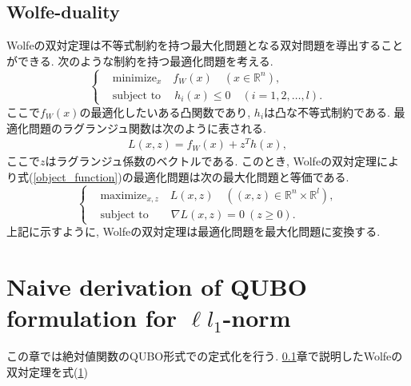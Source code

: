 \documentclass[fp,twocolumn]{jpsj3}
\begin{document}
\subsection{Wolfe-duality} \label{sec:wolfe}
Wolfeの双対定理は不等式制約を持つ最大化問題となる双対問題を導出することができる. 次のような制約を持つ最適化問題を考える.
\begin{equation}
  \left\{
  \begin{aligned}
    & \text{minimize}_{x}  \quad  f_{W}(x) \quad (x\in\mathbb{R}^{n}),\\
    & \text{subject to}  \ \quad h_{i}(x)\leq 0 \quad (i=1,2,\dots,l). \label{object_function}
  \end{aligned}
  \right.
\end{equation}
ここで$f_{W}(x)$の最適化したいある凸関数であり, $h_{i}$は凸な不等式制約である. 最適化問題のラグランジュ関数は次のように表される.
\begin{eqnarray}
  L(x,z)=f_{W}(x)+z^{T}h(x),
\end{eqnarray}
ここで$z$はラグランジュ係数のベクトルである. このとき, Wolfeの双対定理により式(\ref{object_function})の最適化問題は次の最大化問題と等価である.
\begin{equation}
  \left\{
  \begin{aligned}
    & \text{maximize}_{x,z}  \quad L(x,z) \quad ((x,z)\in \mathbb{R}^{n}\times\mathbb{R}^{l}),\\
    & \text{subject to}  \qquad \nabla L(x,z)=0 \ (z \geq 0).
  \end{aligned}
  \right.
\end{equation}
上記に示すように, Wolfeの双対定理は最適化問題を最大化問題に変換する. 

\section{Naive derivation of QUBO formulation for $\ell{l}_{1}$-norm}
この章では絶対値関数のQUBO形式での定式化を行う.
\ref{sec:wolfe}章で説明したWolfeの双対定理を式(\ref{})
\end{document}
